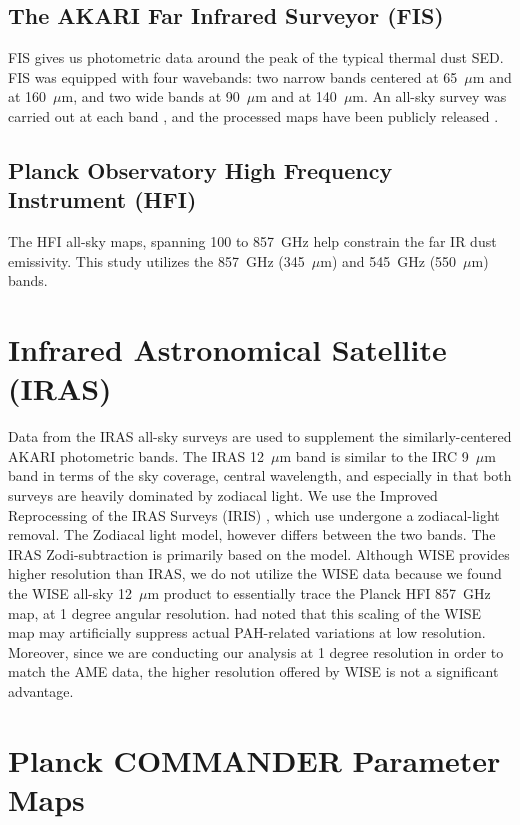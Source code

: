       \subsection{The AKARI Far Infrared Surveyor (FIS)}
           FIS gives us photometric data around the peak of the typical thermal dust SED. FIS was equipped with four wavebands: two narrow bands centered at 65~$\mu$m and at 160~$\mu$m, and two wide bands at 90~$\mu$m and at 140~$\mu$m. An all-sky survey was carried out at each band \citep{kawada07}, and the processed maps have been publicly released \citep{doi15}.
    \subsection{Planck Observatory High Frequency Instrument (HFI)}
       The HFI all-sky maps, spanning 100 to 857~GHz \citep{hfi14viii} help constrain the far IR dust emissivity. This study utilizes the 857~GHz (345~$\mu$m) and 545~GHz (550~$\mu$m) bands.

    \section{Infrared Astronomical Satellite (IRAS)}
       Data from the IRAS \citep{iras84} all-sky surveys are used to supplement the similarly-centered AKARI photometric bands. The IRAS 12~$\mu$m band is similar to the IRC 9~$\mu$m band in terms of the sky coverage, central wavelength, and especially in that both surveys are heavily dominated by zodiacal light. We use the Improved Reprocessing of the IRAS Surveys (IRIS) \citep{iris05}, which use undergone a zodiacal-light removal. The Zodiacal light model, however differs between the two bands. The IRAS Zodi-subtraction is primarily based on the \cite{kelsall98} model. Although WISE provides higher resolution than IRAS, we do not utilize the WISE data because we found the WISE all-sky 12~$\mu$m product to essentially trace the Planck HFI 857~GHz map, at 1 degree angular resolution. \cite{hensley16} had noted that this scaling of the WISE map may artificially suppress actual PAH-related variations at low resolution. Moreover, since we are conducting our analysis at 1 degree resolution in order to match the AME data, the higher resolution offered by WISE is not a significant advantage.

  \section{Planck COMMANDER Parameter Maps}

